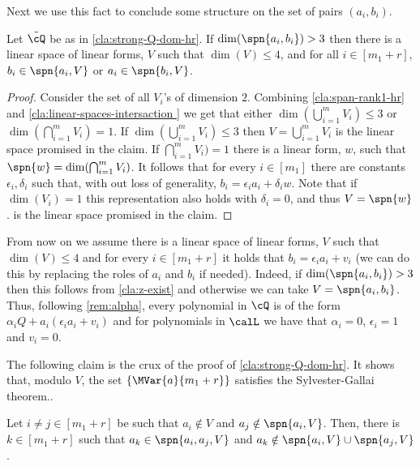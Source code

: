 Next we use this fact to conclude some structure on the set of pairs $(a_i,b_i)$.
 
\begin{claim}\label{cla:z-exist}
Let $\tilde{\cQ}$ be as in \autoref{cla:strong-Q-dom-hr}. If $\dim(\spn{a_i,b_i})>3$ then there is a linear space of linear forms, $V$ such that $\dim(V) \leq 4$, and for all $i\in [m_1+r]$, $b_i \in \spn{a_i,V}$ or $a_i \in \spn{b_i,V}$. 
\end{claim}

\begin{proof}
Consider the set of all $V_i$'s of dimension $2$. Combining   \autoref{cla:span-rank1-hr} and \autoref{cla:linear-spaces-intersaction } we get that either  $\dim(\bigcup_{i=1}^m V_i) \leq 3$ or $\dim(\bigcap_{i=1}^m V_i) =1$. If $\dim(\bigcup_{i=1}^m V_i) \leq 3$ then $V = \bigcup_{i=1}^m V_i$ is the linear space promised in the claim. If $\bigcap_{i=1}^m V_i) =1$
 there is a linear form, $w$, such that $\spn{w} = \dim(\bigcap_{i=1}^m V_i)$. It follows that for every $ i \in [m_1]$ there are constants $\epsilon_i,\delta_i$ such that, with out loss of generality, $ b_i = \epsilon_i a_i + \delta_i w$. Note that if $\dim(V_i) = 1$ this representation also holds with $\delta_i = 0$, and thus $V = \spn{w}$. is the linear space promised in the claim.
\end{proof}

From now on we assume there is a linear space of linear forms, $V$ such that $\dim(V) \leq 4$ and for every $i \in [m_1+r]$ it holds that $b_i = \epsilon_i a_i + v_i$ (we can do this by replacing the roles of $a_i$ and $b_i$ if needed). Indeed, if $\dim(\spn{a_i,b_i})>3$ then this follows from \autoref{cla:z-exist} and otherwise we can take $V=\spn{a_i,b_i}$. Thus, following \autoref{rem:alpha},  every polynomial in $\cQ$ is of the form $\alpha_i Q + a_i(\epsilon_i a_i +v_i)$ and for polynomials in  $\calL$ we have that $\alpha_i = 0$, $\epsilon_i = 1$ and $ v_i = 0$. 

The following claim is the crux of the proof of \autoref{cla:strong-Q-dom-hr}. It shows that, modulo $V$,  the set $\{\MVar{a}{m_1+r}\}$ satisfies the Sylvester-Gallai theorem..

\begin{claim}\label{cla:stisfy-sg-lines-hr}
Let $i\neq j \in [m_1+r]$ be such that $a_i \notin V$ and $a_j \notin \spn{a_i,V}$. Then, there is $k \in [m_1+r]$ such that $a_k \in \spn{a_i,a_j,V}$ and $a_k \notin \spn{a_i,V}\cup \spn{a_j,V}$.
\end{claim}


